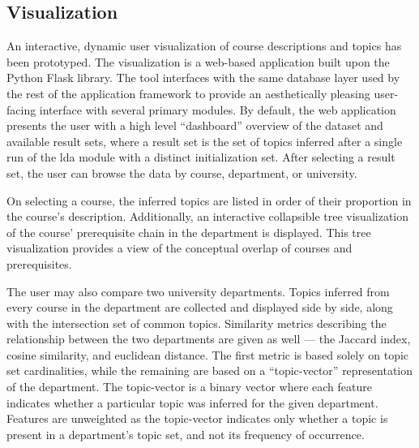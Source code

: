 
\subsection{Visualization}
\label{sec:visualization}


An interactive, dynamic user visualization of course descriptions and topics has been prototyped.
The visualization is a web-based application built upon the Python Flask library.
The tool interfaces with the same database layer used by the rest of the application framework to provide an aesthetically pleasing user-facing interface with several primary modules.
By default, the web application presents the user with a high level ``dashboard'' overview of the dataset and available result sets, where a result set is the set of topics inferred after a single run of the \ac{lda} module with a distinct initialization set.
After selecting a result set, the user can browse the data by course, department, or university.


On selecting a course, the inferred topics are listed in order of their proportion in the course's description.
Additionally, an interactive collapsible tree visualization of the course' prerequisite chain in the department is displayed.
This tree visualization provides a view of the conceptual overlap of courses and prerequisites.


The user may also compare two university departments.
Topics inferred from every course in the department are collected and displayed side by side, along with the intersection set of common topics.
Similarity metrics describing the relationship between the two departments are given as well --- the Jaccard index, cosine similarity, and euclidean distance.
The first metric is based solely on topic set cardinalities, while the remaining are based on a ``topic-vector'' representation of the department.
The topic-vector is a binary vector where each feature indicates whether a particular topic was inferred for the given department.
Features are unweighted as the topic-vector indicates only whether a topic is present in a department's topic set, and not its frequency of occurrence.


